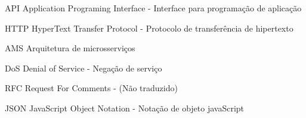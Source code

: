 
\begin{siglas}
	\item[API]{Application Programing Interface - Interface para programação de aplicação}
	\item[HTTP]{HyperText Transfer Protocol - Protocolo de transferência de hipertexto}
	\item[AMS]{Arquitetura de microsserviços}
	\item[DoS]{Denial of Service - Negação de serviço}
	\item[RFC]{Request For Comments - (Não traduzido)}
	\item[JSON]{JavaScript Object Notation - Notação de objeto javaScript}
\end{siglas}